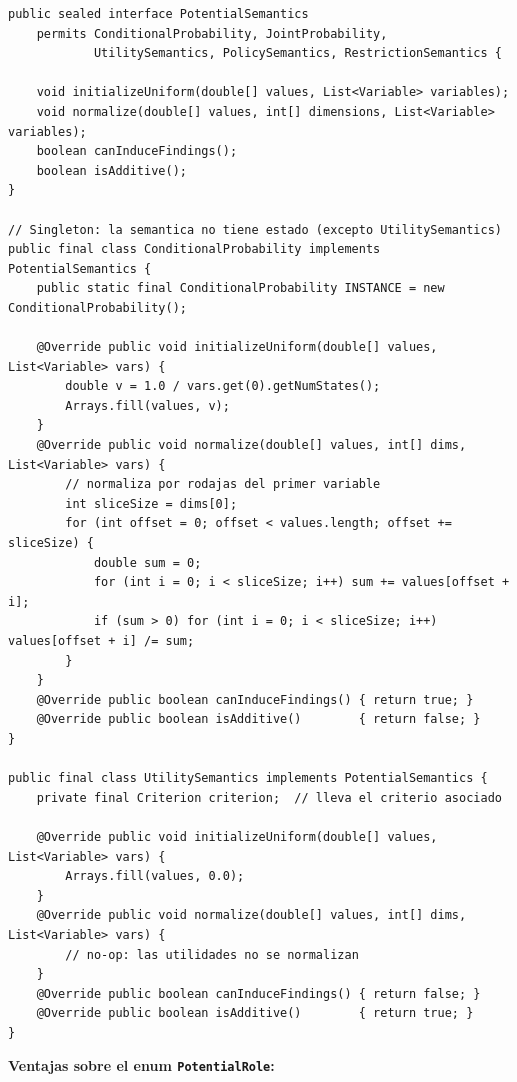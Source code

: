 \documentclass[11pt,a4paper]{article}
\newcommand{\code}[1]{\texttt{#1}}
\begin{document}
\begin{lstlisting}[caption={Interfaz \code{PotentialSemantics} y sus implementaciones}]
public sealed interface PotentialSemantics
    permits ConditionalProbability, JointProbability,
            UtilitySemantics, PolicySemantics, RestrictionSemantics {

    void initializeUniform(double[] values, List<Variable> variables);
    void normalize(double[] values, int[] dimensions, List<Variable> variables);
    boolean canInduceFindings();
    boolean isAdditive();
}

// Singleton: la semantica no tiene estado (excepto UtilitySemantics)
public final class ConditionalProbability implements PotentialSemantics {
    public static final ConditionalProbability INSTANCE = new ConditionalProbability();

    @Override public void initializeUniform(double[] values, List<Variable> vars) {
        double v = 1.0 / vars.get(0).getNumStates();
        Arrays.fill(values, v);
    }
    @Override public void normalize(double[] values, int[] dims, List<Variable> vars) {
        // normaliza por rodajas del primer variable
        int sliceSize = dims[0];
        for (int offset = 0; offset < values.length; offset += sliceSize) {
            double sum = 0;
            for (int i = 0; i < sliceSize; i++) sum += values[offset + i];
            if (sum > 0) for (int i = 0; i < sliceSize; i++) values[offset + i] /= sum;
        }
    }
    @Override public boolean canInduceFindings() { return true; }
    @Override public boolean isAdditive()        { return false; }
}

public final class UtilitySemantics implements PotentialSemantics {
    private final Criterion criterion;  // lleva el criterio asociado

    @Override public void initializeUniform(double[] values, List<Variable> vars) {
        Arrays.fill(values, 0.0);
    }
    @Override public void normalize(double[] values, int[] dims, List<Variable> vars) {
        // no-op: las utilidades no se normalizan
    }
    @Override public boolean canInduceFindings() { return false; }
    @Override public boolean isAdditive()        { return true; }
}
\end{lstlisting}

\noindent \textbf{Ventajas sobre el enum \code{PotentialRole}:}
\end{document}
